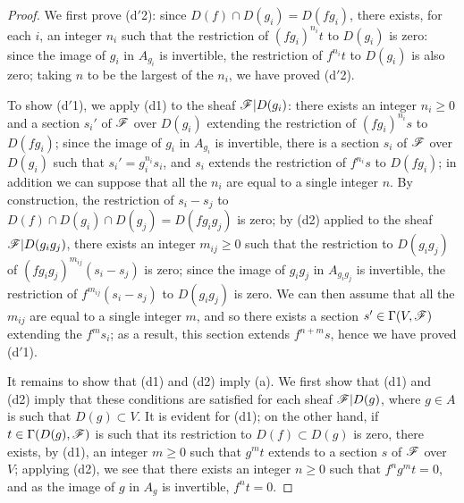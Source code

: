 \begin{proof}
We first prove (d$'$2): since $D(f)\cap D(g_i)=D(fg_i)$, there exists, for each $i$, an integer $n_i$ such that the restriction of $(fg_i)^{n_i}t$ to $D(g_i)$ is zero:
since the image of $g_i$ in $A_{g_i}$ is invertible, the restriction of $f^{n_i}t$ to $D(g_i)$ is also zero;
taking $n$ to be the largest of the $n_i$, we have proved (d$'$2).

To show (d$'$1), we apply (d1) to the sheaf $\mathscr{F}|D(g_i)$: there exists an integer $n_i\geq 0$ and a section $s_i'$ of $\mathscr{F}$ over $D(g_i)$ extending the restriction of $(fg_i)^{n_i}s$ to $D(fg_i)$;
since the image of $g_i$ in $A_{g_i}$ is invertible, there is a section $s_i$ of $\mathscr{F}$ over $D(g_i)$ such that $s_i'=g_i^{n_i}s_i$, and $s_i$ extends the
restriction of $f^{n_i}s$ to $D(fg_i)$;
in addition we can suppose that all the $n_i$ are equal to a single integer $n$.
By construction, the restriction of $s_i-s_j$ to $D(f)\cap D(g_i)\cap D(g_j)=D(fg_i g_j)$ is zero;
by (d2) applied to the sheaf $\mathscr{F}|D(g_i g_j)$, there exists an integer $m_{ij}\geq 0$ such that the restriction to $D(g_i g_j)$ of $(fg_i g_j)^{m_{ij}}(s_i-s_j)$ is zero;
since the image of $g_i g_j$ in $A_{g_i g_j}$ is invertible, the restriction of $f^{m_{ij}}(s_i-s_j)$ to $D(g_i g_j)$ is zero.
We can then assume that all the $m_{ij}$ are equal to a single integer $m$, and so there exists a section $s'\in\Gamma(V,\mathscr{F})$ extending the $f^m s_i$;
as a result, this section extends $f^{n+m}s$, hence we have proved (d$'$1).

It remains to show that (d1) and (d2) imply (a).
We first show that (d1) and (d2) imply that these conditions are satisfied for each sheaf $\mathscr{F}|D(g)$, where $g\in A$ is such that $D(g)\subset V$.
It is evident for (d1);
on the other hand, if $t\in\Gamma(D(g),\mathscr{F})$ is such that its restriction to $D(f)\subset D(g)$ is zero, there exists, by (d1), an integer $m\geq 0$ such that $g^m t$
extends to a section $s$ of $\mathscr{F}$ over $V$;
applying (d2), we see that there exists an integer $n\geq 0$ such that $f^n g^m t=0$, and as the image of $g$ in $A_g$ is invertible, $f^n t=0$.


\end{proof}
